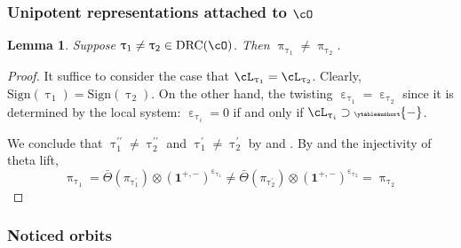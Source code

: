 \documentclass[12pt,a4paper]{amsart}
\newcommand{\bfone}{\mathbf{1}}
\def\abs#1{\left|{#1}\right|}
\numberwithin{equation}{section}
\newtheorem{lem}[thm]{Lemma}
\newtheorem{claim}[thm]{Claim}
\theoremstyle{remark}
\def\ssign{\mathrm{Sign}}
\def\Thetab{\bar{\Theta}}
\def\drc{\mathrm{DRC}}
\let\ytb=\ytableaushort
\newcommand{\tytb}[1]{{\tiny\ytb{#1}}}
\def\cOpp{\cO^{\prime\prime}}
\def\pcL{\cL^+}
\def\uptaup{\uptau^{\prime}}
\def\uptaupp{\uptau^{\prime\prime}}
\begin{document}




\subsubsection{Unipotent representations attached to $\cO$}

\begin{lem}\label{c:gd.D1}
  Suppose $\uptau_{1}\neq \uptau_{2}\in \drc(\cO)$. Then $\uppi_{\uptau_{1}}\neq \uppi_{\uptau_{2}}$.
\end{lem}
\begin{proof}
 It suffice to consider the case that $\cL_{\uptau_{1}}=\cL_{\uptau_{2}}$.
 Clearly, $\ssign(\uptau_{1})=\ssign(\uptau_{2})$. On the other hand,
 the twisting $\upepsilon_{\uptau_{1}}=\upepsilon_{\uptau_{2}}$ since it is
 determined by the  local system:
 $\upepsilon_{\uptau_{i}}=0$ if and only if $\cL_{\uptau_{i}}\supset \tytb{-}$.

 We conclude that $\uptaupp_{1}\neq \uptaupp_{2}$ and $\uptaup_{1}\neq \uptaup_{2}$
 by  and .
 By  and the injectivity of theta lift,
 \[
   \uppi_{\uptau_{1}} = \Thetab(\pi_{\uptaup_{1}})\otimes (\bfone^{+,-})^{\upepsilon_{\uptau_{1}}}
  \neq \Thetab(\pi_{\uptaup_{2}})\otimes (\bfone^{+,-})^{\upepsilon_{\uptau_{2}}} = \uppi_{\uptau_{2}}
 \]
\end{proof}


\subsubsection{Noticed orbits}

\end{document}

